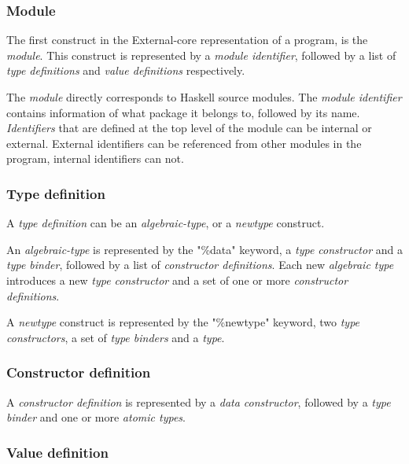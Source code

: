 
\subsubsection{Module}

The first construct in the External-core representation of a program, is the \emph{module}. 
This construct is represented by a \emph{module identifier}, followed by a list of 
\emph{type definitions} and \emph{value definitions} respectively.

The \emph{module} directly corresponds to Haskell source modules. The \emph{module identifier}
contains information of what package it belongs to, followed by its name. \emph{Identifiers} 
that are defined at the top level of the module can be internal or external. External identifiers
can be referenced from other modules in the program, internal identifiers can not.\cite{tolmach2010ghc}


\subsubsection{Type definition}

A \emph{type definition} can be an \emph{algebraic-type}, or a \emph{newtype} construct. 

An \emph{algebraic-type} is represented by the "\%data" keyword, a
\emph{type constructor} and a \emph{type binder}, 
followed by a list of \emph{constructor definitions}.
Each new \emph{algebraic type} introduces a new \emph{type constructor} 
and a set of one or more \emph{constructor definitions}. 

A \emph{newtype} construct is represented by the "\%newtype" keyword, two
\emph{type constructors}, a set of \emph{type binders} and a \emph{type}.\cite{tolmach2010ghc}


\subsubsection{Constructor definition}

A \emph{constructor definition} is represented by a \emph{data constructor}, followed by a 
\emph{type binder} and one or more \emph{atomic types}.





\subsubsection{Value definition}


